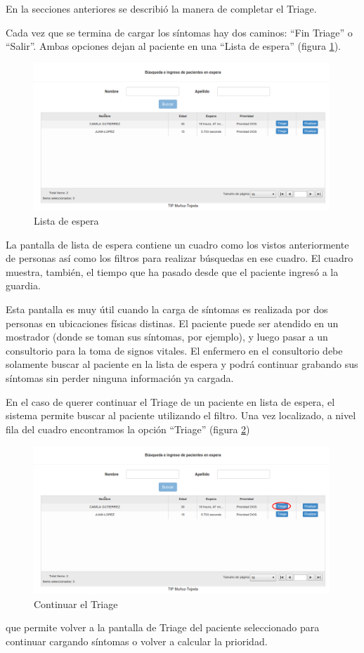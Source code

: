 En la secciones anteriores se describió la manera de completar el Triage. 

Cada vez que se termina de cargar los síntomas hay dos caminos: ``Fin Triage'' o ``Salir''. Ambas opciones dejan al paciente en una ``Lista de espera'' (figura \ref{fig:espera}).
\begin{figure}
\centerline{\includegraphics[width=0.99\textwidth]{espera.png}}
\caption{Lista de espera} \label{fig:espera}
\end{figure}
 La pantalla de lista de espera contiene un cuadro como los vistos anteriormente de personas así como los filtros para realizar búsquedas en ese cuadro. El cuadro muestra, también, el tiempo que ha pasado desde que el paciente ingresó a la guardia.

Esta pantalla es muy útil cuando la carga de síntomas es realizada por dos personas en ubicaciones físicas distinas. El paciente puede ser atendido en un mostrador (donde se toman sus síntomas, por ejemplo), y luego pasar a un consultorio para la toma de signos vitales. El enfermero en el consultorio debe solamente buscar al paciente en la lista de espera y podrá continuar grabando sus síntomas sin perder ninguna información ya cargada.

En el caso de querer continuar el Triage de un paciente en lista de espera, el sistema permite buscar al paciente utilizando el filtro. Una vez localizado, a nivel fila del cuadro encontramos la opción ``Triage'' (figura \ref{fig:espera1})
\begin{figure}
\centerline{\includegraphics[width=0.99\textwidth]{espera1.png}}
\caption{Continuar el Triage} \label{fig:espera1}
\end{figure}
que permite volver a la pantalla de Triage del paciente seleccionado para continuar cargando síntomas o volver a calcular la prioridad.

